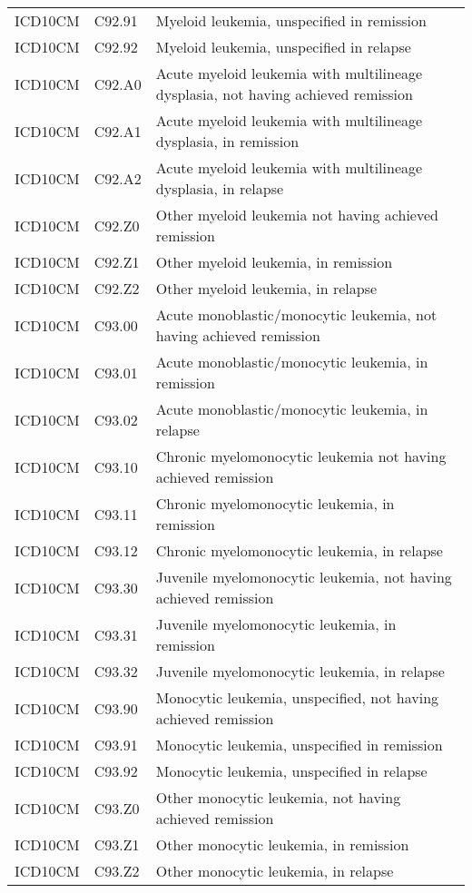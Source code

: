 \begin{longtable}{p{}p{}p{}}
  ICD10CM & C92.91 & Myeloid leukemia, unspecified in remission \\ 
  ICD10CM & C92.92 & Myeloid leukemia, unspecified in relapse \\ 
  ICD10CM & C92.A0 & Acute myeloid leukemia with multilineage dysplasia, not having achieved remission \\ 
  ICD10CM & C92.A1 & Acute myeloid leukemia with multilineage dysplasia, in remission \\ 
  ICD10CM & C92.A2 & Acute myeloid leukemia with multilineage dysplasia, in relapse \\ 
  ICD10CM & C92.Z0 & Other myeloid leukemia not having achieved remission \\ 
  ICD10CM & C92.Z1 & Other myeloid leukemia, in remission \\ 
  ICD10CM & C92.Z2 & Other myeloid leukemia, in relapse \\ 
  ICD10CM & C93.00 & Acute monoblastic/monocytic leukemia, not having achieved remission \\ 
  ICD10CM & C93.01 & Acute monoblastic/monocytic leukemia, in remission \\ 
  ICD10CM & C93.02 & Acute monoblastic/monocytic leukemia, in relapse \\ 
  ICD10CM & C93.10 & Chronic myelomonocytic leukemia not having achieved remission \\ 
  ICD10CM & C93.11 & Chronic myelomonocytic leukemia, in remission \\ 
  ICD10CM & C93.12 & Chronic myelomonocytic leukemia, in relapse \\ 
  ICD10CM & C93.30 & Juvenile myelomonocytic leukemia, not having achieved remission \\ 
  ICD10CM & C93.31 & Juvenile myelomonocytic leukemia, in remission \\ 
  ICD10CM & C93.32 & Juvenile myelomonocytic leukemia, in relapse \\ 
  ICD10CM & C93.90 & Monocytic leukemia, unspecified, not having achieved remission \\ 
  ICD10CM & C93.91 & Monocytic leukemia, unspecified in remission \\ 
  ICD10CM & C93.92 & Monocytic leukemia, unspecified in relapse \\ 
  ICD10CM & C93.Z0 & Other monocytic leukemia, not having achieved remission \\ 
  ICD10CM & C93.Z1 & Other monocytic leukemia, in remission \\ 
  ICD10CM & C93.Z2 & Other monocytic leukemia, in relapse \\ 

\end{longtable}
